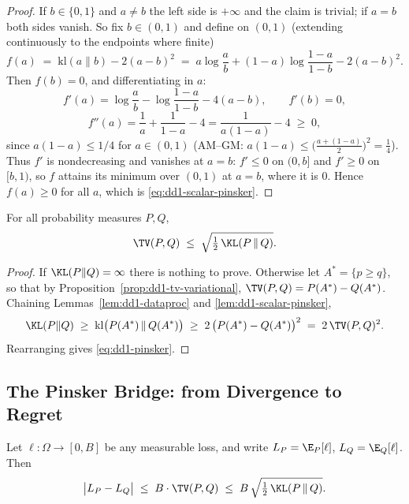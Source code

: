 \begin{proof}
If $b \in \{0, 1\}$ and $a \neq b$ the left side is $+\infty$ and the claim
is trivial; if $a = b$ both sides vanish. So fix $b \in (0,1)$ and define on
$(0,1)$ (extending continuously to the endpoints where finite)
\[
f(a) \;=\; \mathrm{kl}(a \| b) - 2 (a - b)^2
\;=\; a \log\frac{a}{b} + (1 - a)\log\frac{1-a}{1-b} - 2(a-b)^2 .
\]
Then $f(b) = 0$, and differentiating in $a$:
\[
f'(a) = \log \frac{a}{b} - \log \frac{1-a}{1-b} - 4(a - b),
\qquad f'(b) = 0,
\]
\[
f''(a) = \frac{1}{a} + \frac{1}{1 - a} - 4 = \frac{1}{a(1-a)} - 4 \;\ge\; 0,
\]
since $a(1-a) \le 1/4$ for $a \in (0,1)$ (AM--GM: $a(1-a) \le
\bigl(\frac{a + (1-a)}{2}\bigr)^2 = \frac14$). Thus $f'$ is nondecreasing
and vanishes at $a = b$: $f' \le 0$ on $(0, b]$ and $f' \ge 0$ on $[b, 1)$,
so $f$ attains its minimum over $(0,1)$ at $a = b$, where it is $0$. Hence
$f(a) \ge 0$ for all $a$, which is \eqref{eq:dd1-scalar-pinsker}.
\end{proof}

\begin{theorem}
\label{thm:dd1-pinsker}
For all probability measures $P, Q$,
\begin{equation}
\label{eq:dd1-pinsker}
\TV(P, Q) \;\le\; \sqrt{ \tfrac{1}{2}\, \KL(P \,\|\, Q) } .
\end{equation}
\end{theorem}

\begin{proof}
If $\KL(P\|Q) = \infty$ there is nothing to prove. Otherwise let
$A^* = \{p \ge q\}$, so that by
Proposition~\ref{prop:dd1-tv-variational}, $\TV(P, Q) = P(A^*) - Q(A^*)$.
Chaining Lemmas~\ref{lem:dd1-dataproc} and \ref{lem:dd1-scalar-pinsker},
\[
\KL(P \| Q)
\;\ge\; \mathrm{kl}\bigl(P(A^*) \,\|\, Q(A^*)\bigr)
\;\ge\; 2\,\bigl(P(A^*) - Q(A^*)\bigr)^2
\;=\; 2\, \TV(P, Q)^2 .
\]
Rearranging gives \eqref{eq:dd1-pinsker}.
\end{proof}

\subsection{The Pinsker Bridge: from Divergence to Regret}

\begin{theorem}
\label{thm:dd1-bridge}
Let $\ell : \Omega \to [0, B]$ be any measurable loss, and write
$L_P = \E_P[\ell]$, $L_Q = \E_Q[\ell]$. Then
\begin{equation}
\label{eq:dd1-bridge}
\bigl| L_P - L_Q \bigr|
\;\le\; B \cdot \TV(P, Q)
\;\le\; B \, \sqrt{ \tfrac{1}{2} \,\KL(P \,\|\, Q) } .
\end{equation}
\end{theorem}

